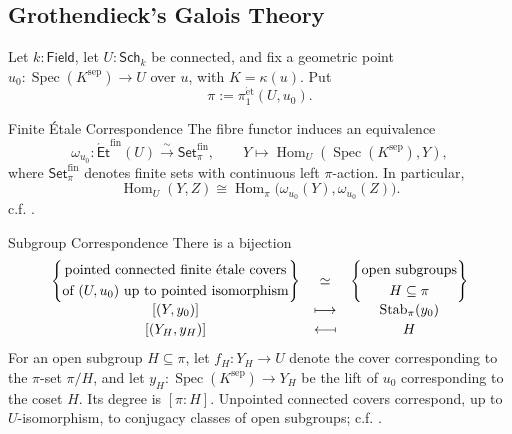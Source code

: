 \documentclass[11pt,letterpaper]{article}
\theoremstyle{numberfirstplain}
\numberwithin{equation}{theorem}
\theoremstyle{numberfirstupright}
\begin{document}
\subsection{Grothendieck's Galois Theory}\label{app:grothendieck-galois-theory}

Let $k:\mathsf{Field}$, let $U:\mathsf{Sch}_k$ be connected, and fix a geometric point $u_0:\operatorname{Spec}(K^{\mathrm{sep}})\to U$ over $u$, with $K=\kappa(u)$. Put
\[
\pi:=\pi_1^{\mathrm{\acute{e}t}}(U,u_0).
\]

\begin{custom}{Finite \'{E}tale Correspondence}\label{thm:finite-etale-correspondence}
The fibre functor induces an equivalence
\[
\omega_{u_0}:\mathsf{\acute{E}t}^{\mathrm{fin}}(U)
\xrightarrow{\sim}\mathsf{Set}^{\mathrm{fin}}_\pi,
\qquad Y\longmapsto\operatorname{Hom}_U(\operatorname{Spec}(K^{\mathrm{sep}}),Y),
\]
where $\mathsf{Set}^{\mathrm{fin}}_\pi$ denotes finite sets with continuous left $\pi$-action. In particular,
\[
\operatorname{Hom}_U(Y,Z)
\cong\operatorname{Hom}_\pi\bigl(\omega_{u_0}(Y),\omega_{u_0}(Z)\bigr).
\]
c.f. \cite[Theorem~58.6.2, Tag~0BND]{StacksProject}.
\end{custom}

\begin{custom}{Subgroup Correspondence}\label{prop:etale-subgroup-correspondence}
There is a bijection
\[
\begin{array}{@{}c@{\quad}c@{\quad}c@{}}
\left\{
\begin{gathered}
\text{pointed connected finite \'{e}tale covers}\\
\text{of }(U,u_0)\text{ up to pointed isomorphism}
\end{gathered}
\right\}
&\simeq&
\left\{
\begin{gathered}
\text{open subgroups}\\
H\subseteq\pi
\end{gathered}
\right\}
\\[6pt]
{[(Y,y_0)]}&\longmapsto&\operatorname{Stab}_\pi(y_0)
\\[2pt]
{[(Y_H,y_H)]}&\mathrel{\reflectbox{$\longmapsto$}}&H
\end{array}
\]
For an open subgroup $H\subseteq\pi$, let $f_H:Y_H\to U$ denote the cover corresponding to the $\pi$-set $\pi/H$, and let $y_H:\operatorname{Spec}(K^{\mathrm{sep}})\to Y_H$ be the lift of $u_0$ corresponding to the coset $H$. Its degree is $\left[\pi:H\right]$. Unpointed connected covers correspond, up to $U$-isomorphism, to conjugacy classes of open subgroups; c.f. \cite[Theorem~58.6.2, Tag~0BND]{StacksProject}.
\end{custom}
\end{document}
